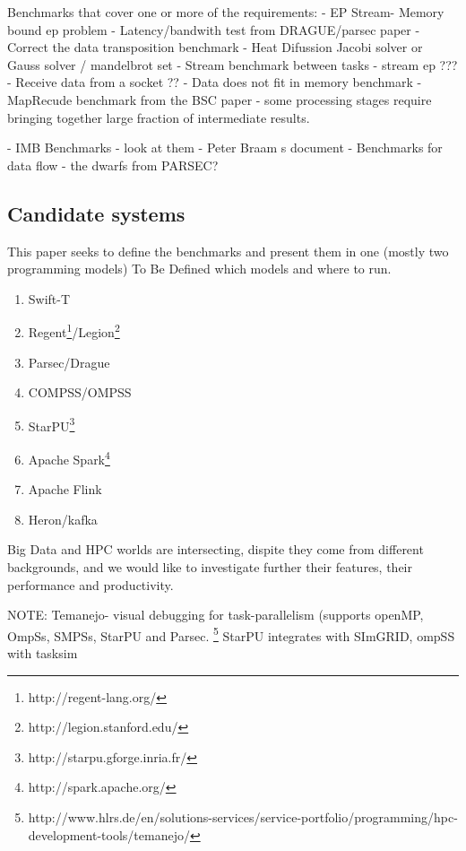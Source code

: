 Benchmarks that cover one or more of the requirements:
- EP Stream- Memory bound ep problem
- Latency/bandwith test from DRAGUE/parsec paper
- Correct the data transposition benchmark 
- Heat Difussion Jacobi solver or Gauss solver / mandelbrot set
- Stream benchmark between tasks - stream ep ???
- Receive data from a socket ??
- Data does not fit in memory benchmark
- MapRecude benchmark from the BSC paper
- some processing stages require bringing together large fraction of intermediate results.


- IMB Benchmarks - look at them
- Peter Braam s document
- Benchmarks for data flow 
- the dwarfs from PARSEC?



\subsection{Candidate systems}

This paper seeks to define the benchmarks and present them in one (mostly two programming models) To Be Defined which models and where to run.

\begin{enumerate}
\item Swift-T 
\item Regent\footnote{http://regent-lang.org/}/Legion\footnote{http://legion.stanford.edu/}
\item Parsec/Drague
\item COMPSS/OMPSS
\item StarPU\footnote{http://starpu.gforge.inria.fr/}
\item Apache Spark\footnote{http://spark.apache.org/}
\item Apache Flink
\item Heron/kafka
\end{enumerate}


Big Data and HPC worlds are intersecting, dispite they come from different backgrounds, and we would like to investigate further their features, their performance and
productivity.


NOTE: Temanejo- visual debugging for task-parallelism (supports openMP, OmpSs, SMPSs, StarPU and Parsec. \footnote{http://www.hlrs.de/en/solutions-services/service-portfolio/programming/hpc-development-tools/temanejo/}
StarPU integrates with SImGRID, ompSS with tasksim



